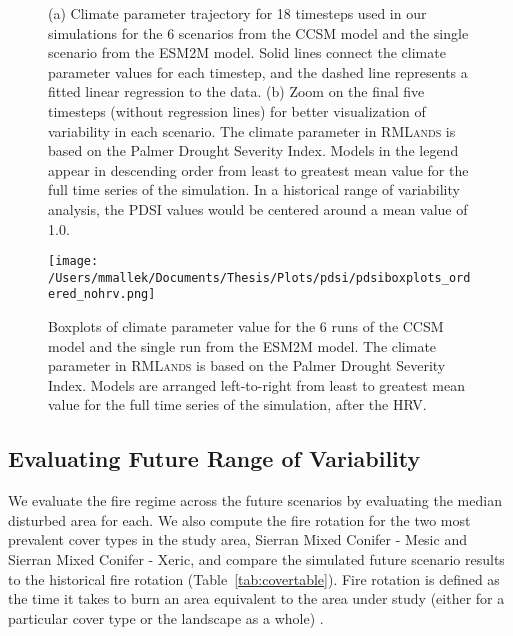 \documentclass[12pt]{article}
\begin{document}
\begin{spacing}{1}
\begin{figure}[!htbp]
\centering
	\caption{(a) Climate parameter trajectory for 18 timesteps used in our simulations for the 6 scenarios from the CCSM model and the single scenario from the ESM2M model. Solid lines connect the climate parameter values for each timestep, and the dashed line represents a fitted linear regression to the data. (b) Zoom on the final five timesteps (without regression lines) for better visualization of variability in each scenario. The climate parameter in \textsc{RMLands} is based on the Palmer Drought Severity Index. Models in the legend appear in descending order from least to greatest mean value for the full time series of the simulation. In a historical range of variability analysis, the PDSI values would be centered around a mean value of 1.0.}
\label{fig:pdsi_future}

\end{figure}



\begin{figure}[!htbp]
\centering
\texttt{[image: /Users/mmallek/Documents/Thesis/Plots/pdsi/pdsiboxplots\_ordered\_nohrv.png]}
\caption{Boxplots of climate parameter value for the 6 runs of the CCSM model and the single run from the ESM2M model.  The climate parameter in \textsc{RMLands} is based on the Palmer Drought Severity Index. Models are arranged left-to-right from least to greatest mean value for the full time series of the simulation, after the HRV.}
\label{pdsi-boxplots}
\end{figure}


\subsection*{Evaluating Future Range of Variability}
We evaluate the fire regime across the future scenarios by evaluating the median disturbed area for each. We also compute the fire rotation for the two most prevalent cover types in the study area, Sierran Mixed Conifer - Mesic and Sierran Mixed Conifer - Xeric, and compare the simulated future scenario results to the historical fire rotation (Table~\ref{tab:covertable}). Fire rotation is defined as the time it takes to burn an area equivalent to the area under study (either for a particular cover type or the landscape as a whole) \citep{Agee1993}.%
%



\end{spacing}
\end{document}
